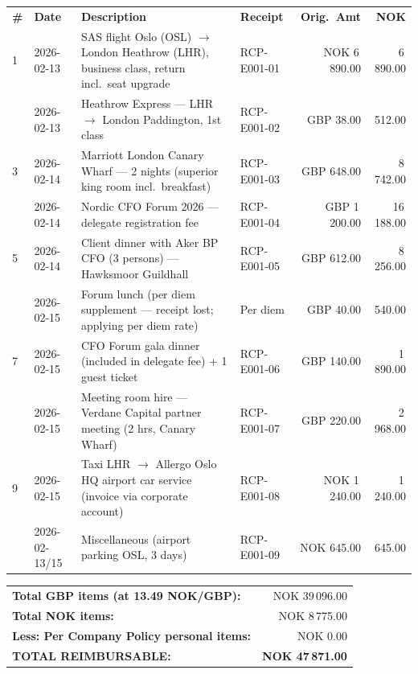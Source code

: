 \documentclass[a4paper,11pt]{article}
\begin{document}
\vspace{6pt}
\begin{tabularx}{\textwidth}{>{\centering}p{0.5cm} p{2cm} >{\raggedright}X p{2.2cm} r r}
  \rowcolor{brand}
  \color{white}\textbf{\#} &
  \color{white}\textbf{Date} &
  \color{white}\textbf{Description} &
  \color{white}\textbf{Receipt} &
  \color{white}\textbf{Orig.\ Amt} &
  \color{white}\textbf{NOK} \\
  \rowcolor{lightgray}
  1 & 2026-02-13 & SAS flight Oslo (OSL) $\to$ London Heathrow (LHR), business class, return incl.\ seat upgrade &
    RCP-E001-01 & NOK 6\,890.00 & 6\,890.00 \\
  2 & 2026-02-13 & Heathrow Express — LHR $\to$ London Paddington, 1st class &
    RCP-E001-02 & GBP 38.00 & 512.00 \\
  \rowcolor{lightgray}
  3 & 2026-02-14 & Marriott London Canary Wharf — 2 nights (superior king room incl.\ breakfast) &
    RCP-E001-03 & GBP 648.00 & 8\,742.00 \\
  4 & 2026-02-14 & Nordic CFO Forum 2026 — delegate registration fee &
    RCP-E001-04 & GBP 1\,200.00 & 16\,188.00 \\
  \rowcolor{lightgray}
  5 & 2026-02-14 & Client dinner with Aker BP CFO (3 persons) — Hawksmoor Guildhall &
    RCP-E001-05 & GBP 612.00 & 8\,256.00 \\
  6 & 2026-02-15 & Forum lunch (per diem supplement — receipt lost; applying per diem rate) &
    Per diem & GBP 40.00 & 540.00 \\
  \rowcolor{lightgray}
  7 & 2026-02-15 & CFO Forum gala dinner (included in delegate fee) + 1 guest ticket &
    RCP-E001-06 & GBP 140.00 & 1\,890.00 \\
  8 & 2026-02-15 & Meeting room hire — Verdane Capital partner meeting (2 hrs, Canary Wharf) &
    RCP-E001-07 & GBP 220.00 & 2\,968.00 \\
  \rowcolor{lightgray}
  9 & 2026-02-15 & Taxi LHR $\to$ Allergo Oslo HQ airport car service (invoice via corporate account) &
    RCP-E001-08 & NOK 1\,240.00 & 1\,240.00 \\
  10 & 2026-02-13/15 & Miscellaneous (airport parking OSL, 3 days) &
    RCP-E001-09 & NOK 645.00 & 645.00 \\
  \bottomrule
\end{tabularx}

\vspace{10pt}

\hfill
\begin{tabular}{lr}
  \toprule
  \textbf{Total GBP items (at 13.49 NOK/GBP):} & NOK 39\,096.00 \\
  \textbf{Total NOK items:} & NOK 8\,775.00 \\
  \textbf{Less: Per Company Policy personal items:} & NOK 0.00 \\
  \midrule
  \rowcolor{brand}
  \color{white}\textbf{TOTAL REIMBURSABLE:} & \color{white}\textbf{NOK 47\,871.00} \\
  \bottomrule
\end{tabular}
\end{document}
